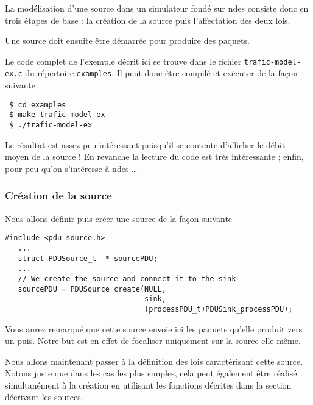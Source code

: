    La modélisation d'une source dans un simulateur fondé sur {\sc
ndes} consiste donc en trois étapes de base : la création de la source
puis l'affectation des deux lois.

   Une source doit ensuite être démarrée pour produire des paquets.

   Le code complet de l'exemple décrit ici se trouve dans le fichier
{\tt trafic-model-ex.c} du répertoire {\tt examples}. Il peut donc
être compilé et exécuter de la façon suivante

\begin{verbatim}
 $ cd examples
 $ make trafic-model-ex
 $ ./trafic-model-ex
\end{verbatim}

   Le résultat est assez peu intéressant puisqu'il se contente
d'afficher le débit moyen de la source ! En revanche la lecture du
code est très intéressante ; enfin, pour peu qu'on s'intéresse à {\sc
  ndes} \ldots

%
\subsubsection{Création de la source}

   Nous allons définir puis créer une source de la façon suivante

\begin{verbatim}
#include <pdu-source.h>
   ...
   struct PDUSource_t  * sourcePDU;
   ...
   // We create the source and connect it to the sink
   sourcePDU = PDUSource_create(NULL,
                                sink,
                                (processPDU_t)PDUSink_processPDU);
\end{verbatim}

   Vous aurez remarqué que cette source envoie ici les paquets qu'elle
produit vers un puis. Notre but est en effet de focaliser uniquement
sur la source elle-même.

   Nous allons maintenant passer à la définition des lois
caractérisant cette source. Notons juste que dans les cas les plus
simples, cela peut également être réalisé simultanément à la création
en utilisant les fonctions décrites dans la section décrivant les
sources. 

%
